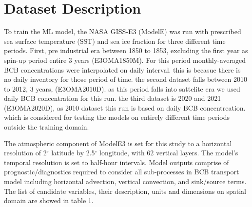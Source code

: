 \documentclass{article}
\begin{document}
\section{Dataset Description}
    To train the ML model, the NASA GISS-E3 (ModelE) was run with prescribed sea surface temperature (SST) and sea ice fraction for three different time periods. First, pre industrial era between 1850 to 1853, excluding the first year as spin-up period entire 3 years (E3OMA1850M). For this period monthly-averaged BCB concentrations were interpolated on daily interval. this is becasue there is no daily inventory for those period of time. the second dataset falls between 2010 to 2012, 3 years, (E3OMA2010D). as this period falls into sattelite era we used daily BCB concentration for this run. the third dataset is 2020 and 2021 (E3OMA2020D), as 2010 dataset this run is based on daily BCB concentreation.  which is considered for testing the models on entirely different time periods outside the training domain.
    
    The atmospheric component of ModelE3 is set for this study to a horizontal resolution of 2$^\circ$ latitude by 2.5$^\circ$ longitude, with 62 vertical layers. The model's temporal resolution is set to half-hour intervals. Model outputs comprise of prognostic/diagnostics required to consider all sub-processes in BCB transport model including horizontal advection, vertical convection, and sink/source terms. The list of candidate variables, their description, units and dimensions on spatial domain are showed in table 1.
    
\end{document}

